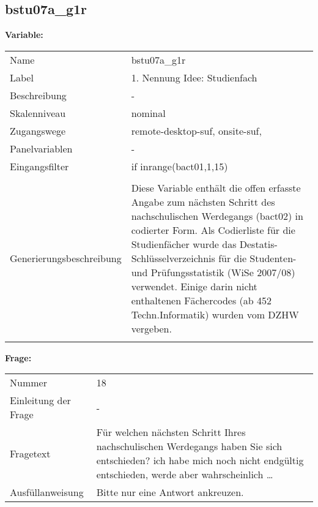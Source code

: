 	
	
	\subsection{bstu07a\_g1r}
	\label{subSection:bstu07a_g1r}

	\noindent\textbf{Variable:}\\
		\begin{tabular}{lL{11.3cm}}
			\label{tableVariable:bstu07a_g1r}
			Name & bstu07a\_g1r \\
			Label & 1. Nennung Idee: Studienfach \\
			Beschreibung & - \\
			Skalenniveau & nominal \\
			Zugangswege &
				remote-desktop-suf,
				onsite-suf,
 \\
			Panelvariablen & -
			 \\
			Eingangsfilter & if inrange(bact01,1,15) \\
 \\
					Generierungsbeschreibung & Diese Variable enthält die offen erfasste Angabe zum nächsten Schritt des nachschulischen Werdegangs (bact02) in codierter Form.  Als Codierliste für die Studienfächer wurde das Destatis-Schlüsselverzeichnis für die Studenten- und Prüfungsstatistik (WiSe 2007/08) verwendet. Einige darin nicht enthaltenen Fächercodes (ab 452 Techn.Informatik) wurden vom DZHW vergeben.
				 \\	
			 \\
		\end{tabular}

		\vspace*{1 cm}
		\noindent\textbf{Frage:}\\
		\begin{tabular}{lL{11.3cm}}
			\label{tableQuestion:bstu07a_g1r}
			Nummer & 18 \\
			Einleitung der Frage & - \\
			Fragetext & Für welchen nächsten Schritt Ihres nachschulischen Werdegangs haben Sie sich entschieden?
ich habe mich noch nicht endgültig entschieden, werde aber wahrscheinlich … \\
			Ausfüllanweisung & Bitte nur eine Antwort ankreuzen. \\
		\end{tabular}





